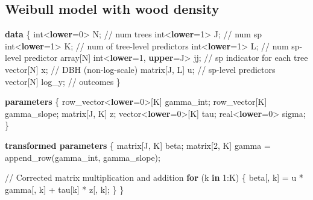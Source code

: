 \documentclass[
  12pt,
  letterpaper,
  DIV=11,
  numbers=noendperiod]{scrartcl}
\newenvironment{Shaded}{\begin{snugshade}}{\end{snugshade}}
\newcommand{\CommentTok}[1]{\textcolor[rgb]{0.37,0.37,0.37}{#1}}
\newcommand{\ControlFlowTok}[1]{\textcolor[rgb]{0.00,0.23,0.31}{\textbf{#1}}}
\newcommand{\DataTypeTok}[1]{\textcolor[rgb]{0.68,0.00,0.00}{#1}}
\newcommand{\DecValTok}[1]{\textcolor[rgb]{0.68,0.00,0.00}{#1}}
\newcommand{\KeywordTok}[1]{\textcolor[rgb]{0.00,0.23,0.31}{\textbf{#1}}}
\newcommand{\NormalTok}[1]{\textcolor[rgb]{0.00,0.23,0.31}{#1}}
\begin{document}
\newpage

\subsection{Weibull model with wood
density}\label{weibull-model-with-wood-density}

\begin{Shaded}
\begin{Highlighting}[]
\KeywordTok{data}\NormalTok{ \{}
  \DataTypeTok{int}\NormalTok{\textless{}}\KeywordTok{lower}\NormalTok{=}\DecValTok{0}\NormalTok{\textgreater{} N;                    }\CommentTok{// num trees}
  \DataTypeTok{int}\NormalTok{\textless{}}\KeywordTok{lower}\NormalTok{=}\DecValTok{1}\NormalTok{\textgreater{} J;                    }\CommentTok{// num sp}
  \DataTypeTok{int}\NormalTok{\textless{}}\KeywordTok{lower}\NormalTok{=}\DecValTok{1}\NormalTok{\textgreater{} K;                    }\CommentTok{// num of tree{-}level predictors}
  \DataTypeTok{int}\NormalTok{\textless{}}\KeywordTok{lower}\NormalTok{=}\DecValTok{1}\NormalTok{\textgreater{} L;                    }\CommentTok{// num sp{-}level predictor}
  \DataTypeTok{array}\NormalTok{[N] }\DataTypeTok{int}\NormalTok{\textless{}}\KeywordTok{lower}\NormalTok{=}\DecValTok{1}\NormalTok{, }\KeywordTok{upper}\NormalTok{=J\textgreater{} jj; }\CommentTok{// sp indicator for each tree}
  \DataTypeTok{vector}\NormalTok{[N] x;                       }\CommentTok{// DBH (non{-}log{-}scale)}
  \DataTypeTok{matrix}\NormalTok{[J, L] u;                    }\CommentTok{// sp{-}level predictors}
  \DataTypeTok{vector}\NormalTok{[N] log\_y;                   }\CommentTok{// outcomes}
\NormalTok{\}}

\KeywordTok{parameters}\NormalTok{ \{}
  \DataTypeTok{row\_vector}\NormalTok{\textless{}}\KeywordTok{lower}\NormalTok{=}\DecValTok{0}\NormalTok{\textgreater{}[K] gamma\_int;}
  \DataTypeTok{row\_vector}\NormalTok{[K] gamma\_slope;}
  \DataTypeTok{matrix}\NormalTok{[J, K] z;}
  \DataTypeTok{vector}\NormalTok{\textless{}}\KeywordTok{lower}\NormalTok{=}\DecValTok{0}\NormalTok{\textgreater{}[K] tau;}
  \DataTypeTok{real}\NormalTok{\textless{}}\KeywordTok{lower}\NormalTok{=}\DecValTok{0}\NormalTok{\textgreater{} sigma;}
\NormalTok{\}}

\KeywordTok{transformed parameters}\NormalTok{ \{}
  \DataTypeTok{matrix}\NormalTok{[J, K] beta;}
  \DataTypeTok{matrix}\NormalTok{[}\DecValTok{2}\NormalTok{, K] gamma = append\_row(gamma\_int, gamma\_slope);}

  \CommentTok{// Corrected matrix multiplication and addition}
  \ControlFlowTok{for}\NormalTok{ (k }\ControlFlowTok{in} \DecValTok{1}\NormalTok{:K) \{}
\NormalTok{    beta[, k] = u * gamma[, k] + tau[k] * z[, k];}
\NormalTok{  \}}
\NormalTok{\}}


\end{Highlighting}
\end{Shaded}
\end{document}
